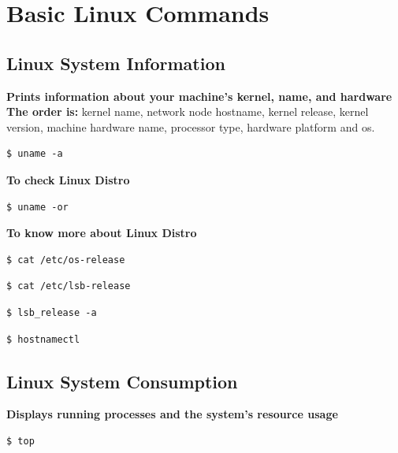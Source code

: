 \documentclass{article}
\newenvironment{codetemplate}[1][]{%
  \mybasecolorbox[#1]
  \itshape
}{%
  \endmybasecolorbox
}
\begin{document}
\newpage
\section{Basic Linux Commands}

\subsection{Linux System Information}
\textbf{Prints information about your machine’s kernel, name, and hardware}
\\ \textbf{The order is: }kernel name, network node hostname, kernel release, kernel version, machine hardware name, processor type, hardware platform and os.
\begin{codetemplate}{}
\begin{verbatim}
$ uname -a
\end{verbatim}
\end{codetemplate}

\textbf{To check Linux Distro}
\begin{codetemplate}{}
\begin{verbatim}
$ uname -or
\end{verbatim}
\end{codetemplate}

\textbf{To know more about Linux Distro}
\begin{codetemplate}{}
\begin{verbatim}
$ cat /etc/os-release
\end{verbatim}
\end{codetemplate}
\begin{codetemplate}{}
\begin{verbatim}
$ cat /etc/lsb-release
\end{verbatim}
\end{codetemplate}
\begin{codetemplate}{}
\begin{verbatim}
$ lsb_release -a
\end{verbatim}
\end{codetemplate}
\begin{codetemplate}{}
\begin{verbatim}
$ hostnamectl
\end{verbatim}
\end{codetemplate}

\subsection{Linux System Consumption}
\textbf{Displays running processes and the system’s resource usage}
\begin{codetemplate}{}
\begin{verbatim}
$ top
\end{verbatim}
\end{codetemplate}
\end{document}
